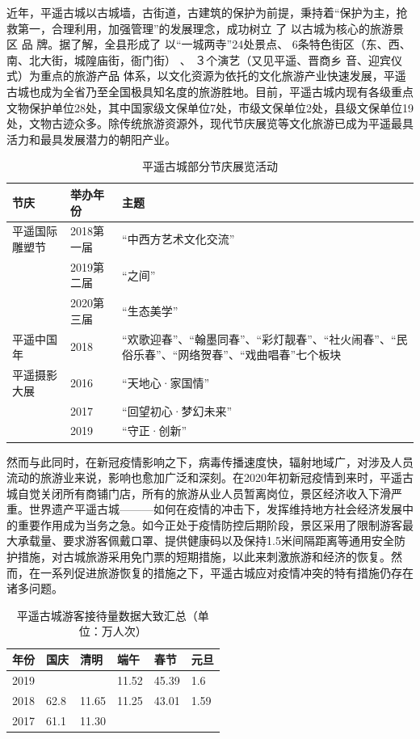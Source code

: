 \documentclass[UTF8]{ctexart}
\begin{document}
近年，平遥古城以古城墙，古街道，古建筑的保护为前提，秉持着“保护为主，抢救第一，合理利用，加强管理”的发展理念，成功树立 了 以古城为核心的旅游景区 品 牌。据了解，全县形成了 以“一城两寺”24处景点、 6条特色街区（东、西、南、北大街，城隍庙街，衙门街） 、 ３个演艺（又见平遥、晋商乡 音、迎宾仪式）为重点的旅游产品 体系，以文化资源为依托的文化旅游产业快速发展，平遥古城也成为全省乃至全国极具知名度的旅游胜地。目前，平遥古城内现有各级重点文物保护单位28处，其中国家级文保单位7处，市级文保单位2处，县级文保单位19处，文物古迹众多。除传统旅游资源外，现代节庆展览等文化旅游已成为平遥最具活力和最具发展潜力的朝阳产业。
\begin{table}[H]
    \centering
    \caption{平遥古城部分节庆展览活动}
    \begin{tabular}{p{4cm}p{4cm}p{4cm}}
        \toprule
        节庆 & 举办年份 & 主题\\
        \midrule
        平遥国际雕塑节 & 2018第一届 &“中西方艺术文化交流”\\
        &2019第二届&“之间”\\
        &2020第三届&“生态美学”\\
        \cmidrule{1-3}
        平遥中国年&2018&“欢歌迎春”、“翰墨同春”、“彩灯靓春”、“社火闹春”、“民俗乐春”、“网络贺春”、“戏曲唱春”七个板块\\
        \cmidrule{1-3}
        平遥摄影大展&2016&“天地心·家国情”\\
        &2017&“回望初心·梦幻未来”\\
        &2019&“守正·创新”\\
        \bottomrule
    \end{tabular}
\end{table}
然而与此同时，在新冠疫情影响之下，病毒传播速度快，辐射地域广，对涉及人员流动的旅游业来说，影响也愈加广泛和深刻。在2020年初新冠疫情到来时，平遥古城自觉关闭所有商铺门店，所有的旅游从业人员暂离岗位，景区经济收入下滑严重。世界遗产平遥古城———如何在疫情的冲击下，发挥维持地方社会经济发展中的重要作用成为当务之急。如今正处于疫情防控后期阶段，景区采用了限制游客最大承载量、要求游客佩戴口罩、提供健康码以及保持1.5米间隔距离等通用安全防护措施，对古城旅游采用免门票的短期措施，以此来刺激旅游和经济的恢复。然而，在一系列促进旅游恢复的措施之下，平遥古城应对疫情冲突的特有措施仍存在诸多问题。
\begin{table}[H]
    \centering
    \caption{平遥古城游客接待量数据大致汇总（单位：万人次）}
    \begin{tabular}{p{2cm}p{2cm}p{2cm}p{2cm}p{2cm}p{2cm}}
        \toprule
        年份 & 国庆&清明&端午&春节&元旦\\ 
        \midrule
        2019& & & 11.52 & 45.39 & 1.6\\ 
        2018& 62.8 & 11.65 & 11.25 & 43.01 & 1.59 \\ 
        2017& 61.1 & 11.30 & & & \\ 
        \bottomrule
    \end{tabular}
\end{table}
\end{document}

